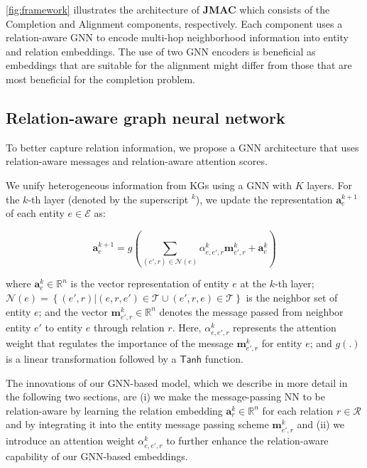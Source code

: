 \documentclass[11pt]{article}
\begin{document}
\autoref{fig:framework} illustrates the architecture of \textbf{JMAC} which consists of the Completion and Alignment components, respectively. Each component uses a relation-aware GNN to encode multi-hop neighborhood information into entity and relation embeddings. The use of two GNN encoders is beneficial as embeddings that are suitable for the alignment might differ from those that are most beneficial for the completion problem.




\subsection{Relation-aware graph neural network}\label{ssec:relationgnn}

To better capture relation information, we propose a GNN architecture that uses relation-aware messages and relation-aware attention scores. 

We unify heterogeneous information from KGs using a GNN with $K$ layers. For the $k$-th layer (denoted by the superscript $^k$), we update the representation $\mathbf{a}_e^{k + 1}$ of each entity $e \in \mathcal{E}$ as:

\setlength{\abovedisplayskip}{0pt}
\setlength{\belowdisplayskip}{5pt}
\begin{equation}
    \mathbf{a}_e^{k + 1} = g \left( \sum_{(e', r) \in \mathcal{N}(e)} \alpha_{e,e',r}^k \mathbf{m}^k_{e',r} + \mathbf{a}_e^{k} \right)
    \label{eqn:entity_update}
\end{equation}

\noindent where $\mathbf{a}_e^{k} \in \mathbb{R}^n$ is the vector representation of entity $e$ at the $k$-th layer; $\mathcal{N}(e) = \left\{(e', r) | ( e, r, e' ) \in \mathcal{T} \cup ( e', r, e ) \in \mathcal{T} \right\}$ is the neighbor set of entity $e$; and the vector $\mathbf{m}^k_{e',r} \in \mathbb{R}^n$ denotes the message passed from neighbor entity $e'$ to entity $e$ through relation $r$. Here,  $\alpha^k_{e,e',r}$ represents the attention weight that regulates the importance of the message $\mathbf{m}^k_{e',r}$ for entity $e$; and $g(.)$ is a linear transformation followed by a $\mathsf{Tanh}$ function. 

The innovations of our GNN-based model, which we describe in more detail in the following two sections, are (i) we make the message-passing NN to be relation-aware by learning the relation embedding $\mathbf{a}^{k}_r \in \mathbb{R}^n$ for each relation $r \in \mathcal{R}$ and by integrating it into the entity message passing scheme $\mathbf{m}^k_{e',r}$ and (ii) we introduce an attention weight $\alpha^k_{e,e',r}$ to further enhance the relation-aware capability of our GNN-based embeddings. 
\end{document}

